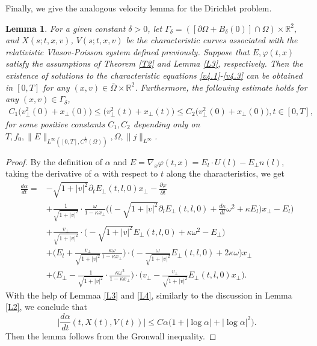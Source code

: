 \documentclass[11pt,reqno]{amsart}%
\newtheorem{Lemma}{Lemma}[section]
\theoremstyle{definition}
\theoremstyle{remark}
\begin{document}
Finally, we give the analogous velocity lemma for the Dirichlet problem.
\begin{Lemma}\label{L5}
For a given constant $\delta >0$, let $\Gamma_{\delta}=([\partial\Omega +B_{\delta}(0)]\cap \Omega)\times \mathbb{R}^{2},$
and $X(s;t,x,v)$, $V(s;t,x,v)$ be the characteristic curves associated with the  relativistic
Vlasov-Poisson system defined previously.
Suppose that $E,\varphi (t,x)$ satisfy the assumptions of  Theorem \ref{T2} and Lemma \ref{L3}, respectively. Then
the existence of solutions to the characteristic equations \eqref{v4.1}-\eqref{v4.3} can be obtained in $[0,T]$
for any $(x,v)\in \bar{\Omega}\times \mathbb{R}^{2}$.
Furthermore,   the following estimate holds  for any $(x, v) \in\Gamma_{\delta}$,   
\begin{align}
C_{1}\Big(v^{2}_{\bot}(0)+x_{\bot}(0)\Big)\leq \Big(v^{2}_{\bot}(t)+x_{\bot}(t)\Big) \leq C_{2}\Big(v^{2}_{\bot}(0)+x_{\bot}(0)\Big), t\in[0,T],\label{v7.5}
\end{align}
for some positive constants $C_{1}, C_{2}$ depending only on
$T,f_{0},\|E\|_{L^{\infty}([0,T],C^{\frac{1}{2}}(\Omega))}, \Omega, \|j\|_{L^{\infty}}$.
\end{Lemma}
\begin{proof}
By the definition of $\alpha$ and $E=\nabla_{x}\varphi(t,x)=E_{l}\cdot U(l)-E_{\bot}n(l)$, taking the derivative of $\alpha$ with respect to $t$ along the characteristics, we get
\begin{align}
\frac{d \alpha}{d t}=&-\sqrt{1+|v|^{2}}\partial_{t}E_{\bot}(t,l,0)x_{\bot}-\frac{\partial \varphi}{\partial t}\nonumber\\
&+\frac{1}{\sqrt{1+|v|^{2}}}\cdot\frac{\omega}{1-\kappa x_{\perp}}\Big(
\big(-\sqrt{1+|v|^{2}}\partial_{l}E_{\bot}(t,l,0)+\frac{d \kappa}{d l}\omega^{2}+\kappa E_{l}\big)x_{\bot}-E_{l}\Big)\nonumber\\
&+\frac{v_{\bot}}{\sqrt{1+|v|^{2}}}\cdot\Big(-\sqrt{1+|v|^{2}}E_{\bot}(t,l,0)+\kappa \omega^{2}-E_{\bot}\Big)\nonumber\\
&+\Big(E_{l}+\frac{v_{\bot}}{\sqrt{1+|v|^{2}}}\frac{\kappa\omega}{1-\kappa x_{\bot}}\Big)\cdot\Big(-\frac{\omega}{\sqrt{1+|v|^{2}}}E_{\bot}(t,l,0)+2\kappa \omega \Big)x_{\bot}\nonumber\\
&+\Big(E_{\bot}-\frac{1}{\sqrt{1+|v|^{2}}}\cdot\frac{\kappa\omega^{2}}{1-\kappa x_{\bot}}\Big)\cdot \Big(v_{\bot}-\frac{v_{\bot}}{\sqrt{1+|v|^{2}}}E_{\bot}(t,l,0)x_{\bot}\Big).\nonumber
\end{align}
With the help of Lemmaa \ref{L3} and \ref{L4}, similarly to the discussion in Lemma \ref{L2}, we conclude that
$$\Big|\frac{d \alpha}{d t}(t,X(t),V(t))\Big|\leq C \alpha \big(1+|\log \alpha|+|\log \alpha|^{2}\big).$$
Then the lemma follows from the Gronwall inequality.
\end{proof}
\end{document}
